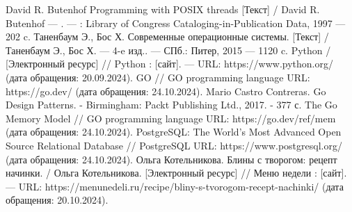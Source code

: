 
\begin{thebibliography}{}
	 David R. Butenhof Programming with POSIX threads [Текст] / David R. Butenhof — . — : Library of Congress Cataloging-in-Publication Data, 1997 — 202 c.
	 Таненбаум Э., Бос Х. Современные операционные системы. [Текст] / Таненбаум Э., Бос Х. — 4-e изд.. — СПб.: Питер, 2015 — 1120 c.
	  Python /  [Электронный ресурс] // Python : [сайт]. — URL: https://www.python.org/ (дата обращения: 20.09.2024).
	 GO // GO programming language URL: https://go.dev/ (дата обращения: 24.10.2024).
	 Mario Castro Contreras. Go Design Patterns. - Birmingham: Packt Publishing Ltd., 2017. - 377 с.
	 The Go Memory Model // GO programming language URL: https://go.dev/ref/mem (дата обращения: 24.10.2024).
	 PostgreSQL: The World's Most Advanced Open Source Relational Database // PostgreSQL URL: https://www.postgresql.org/ (дата обращения: 24.10.2024).
	 Ольга Котельникова. Блины с творогом: рецепт начинки. / Ольга Котельникова. [Электронный ресурс] // Меню недели : [сайт]. — URL: https://menunedeli.ru/recipe/bliny-s-tvorogom-recept-nachinki/ (дата обращения: 20.10.2024).
\end{thebibliography}
